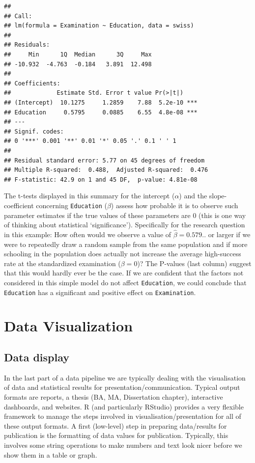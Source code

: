 \documentclass[
  12pt,
]{style/krantz}
\begin{document}
\begin{verbatim}
## 
## Call:
## lm(formula = Examination ~ Education, data = swiss)
## 
## Residuals:
##     Min      1Q  Median      3Q     Max 
## -10.932  -4.763  -0.184   3.891  12.498 
## 
## Coefficients:
##             Estimate Std. Error t value Pr(>|t|)    
## (Intercept)  10.1275     1.2859    7.88  5.2e-10 ***
## Education     0.5795     0.0885    6.55  4.8e-08 ***
## ---
## Signif. codes:  
## 0 '***' 0.001 '**' 0.01 '*' 0.05 '.' 0.1 ' ' 1
## 
## Residual standard error: 5.77 on 45 degrees of freedom
## Multiple R-squared:  0.488,  Adjusted R-squared:  0.476 
## F-statistic: 42.9 on 1 and 45 DF,  p-value: 4.81e-08
\end{verbatim}

The t-tests displayed in this summary for the intercept (\(\alpha\)) and the slope-coefficient concerning \texttt{Education} (\(\beta\)) assess how probable it is to observe such parameter estimates if the true values of these parameters are 0 (this is one way of thinking about statistical `significance'). Specifically for the research question in this example: How often would we observe a value of \(\hat{\beta}=0.579..\) or larger if we were to repeatedly draw a random sample from the same population and if more schooling in the population does actually not increase the average high-success rate at the standardized examination (\(\beta=0\))? The P-values (last column) suggest that this would hardly ever be the case. If we are confident that the factors not considered in this simple model do not affect \texttt{Education}, we could conclude that \texttt{Education} has a significant and positive effect on \texttt{Examination}.

\hypertarget{data-visualization}{%
\chapter{Data Visualization}\label{data-visualization}}

\hypertarget{data-display}{%
\section{Data display}\label{data-display}}

In the last part of a data pipeline we are typically dealing with the visualisation of data and statistical results for presentation/communication. Typical output formats are reports, a thesis (BA, MA, Dissertation chapter), interactive dashboards, and websites. R (and particularly RStudio) provides a very flexible framework to manage the steps involved in visualisation/presentation for all of these output formats. A first (low-level) step in preparing data/results for publication is the formatting of data values for publication. Typically, this involves some string operations to make numbers and text look nicer before we show them in a table or graph.
\end{document}

